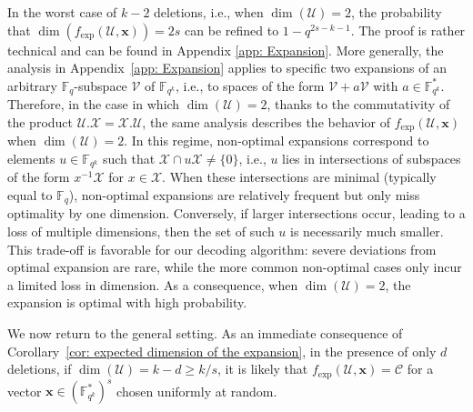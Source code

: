 \documentclass{article}
\newcommand{\Fq}{\mathbb{F}_{q}}
\newcommand{\Fqk}{\mathbb{F}_{q^k}}
\newcommand{\calC}{\mathcal{C}}
\newcommand{\calU}{\mathcal{U}}
\newcommand{\calV}{\mathcal{V}}
\newcommand{\calX}{\mathcal{X}}
\newcommand{\fexp}{f_{\mathrm{exp}}}
\begin{document}
In the worst case of $k-2$ deletions, i.e., when $\dim(\calU)=2$, the probability that $\dim(\fexp(\calU, \bm x))=2s$ can be refined to $1 - q^{2s - k - 1}$.
The proof is rather technical and can be found in Appendix \ref{app: Expansion}. More generally, the analysis in Appendix~\ref{app: Expansion} applies to specific two expansions of an arbitrary $\Fq$-subspace $\calV$ of $\Fqk$, i.e., to spaces of the form $\calV + a \calV$ with $a\in\Fqk^*$. Therefore, in the case in which $\dim(\calU)=2$, thanks to the commutativity of the product $\calU.\calX = \calX.\calU$, the same analysis describes the behavior of $\fexp(\calU,\bm x)$ when $\dim(\calU)=2$.
In this regime, non-optimal expansions correspond to elements $u \in \Fqk$ such that $\calX \cap u\calX \neq \{0\}$, i.e., $u$ lies in intersections of subspaces of the form $x^{-1}\calX$ for $x \in \calX$.
When these intersections are minimal (typically equal to $\Fq$), non-optimal expansions are relatively frequent but only miss optimality by one dimension.
Conversely, if larger intersections occur, leading to a loss of multiple dimensions, then the set of such $u$ is necessarily much smaller.
This trade-off is favorable for our decoding algorithm: severe deviations from optimal expansion are rare, while the more common non-optimal cases only incur a limited loss in dimension.
As a consequence, when $\dim(\calU)=2$, the expansion is optimal with high probability.
\\
\par We now return to the general setting. As an immediate consequence of Corollary~\ref{cor: expected dimension of the expansion}, in the presence of only $d$ deletions, if $\dim(\calU)=k-d \geq k/s$, it is likely that $\fexp(\calU, \bm x) = \calC$ for a vector $\bm x \in (\Fqk^*)^s$ chosen uniformly at random.
\end{document}

